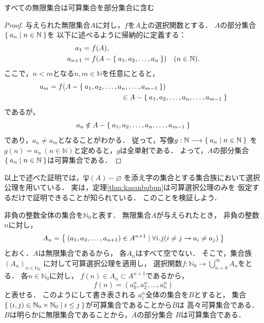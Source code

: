   \begin{thm} \label{thm:kasanbubun}
    すべての無限集合は可算集合を部分集合に含む
  \end{thm}


  \begin{proof}
    与えられた無限集合$A$に対し，$f$を$A$上の選択関数とする．
    $A$の部分集合$\Set{ a_n \mid n \in \mathbb{N}}$を
    以下に述べるように帰納的に定義する：
    \begin{align*}
      a_1 & = f(A) , \\
      a_{n+1} & = f ( A - \Set{ a_1 , a_2 , \ldots , a_n} ) \quad (n \in \mathbb{N} ).
    \end{align*}
    ここで，$n<m$となる$n ,m \in \mathbb{N}$を任意にとると，
    \begin{align*}
      & a_m = f( A - \Set{ a_1,a_2 , \ldots , a_n , \ldots , a_{m-1}}) \\
      & \hspace{4cm} \in A- \Set{ a_1,a_2, \ldots, a_n , \ldots   ,a_{m-1}}
    \end{align*}
    であるが，
    \begin{align*}
      a_n \notin A- \Set{ a_1, a_2 , \ldots ,a_n , \ldots , a_{m-1} }
    \end{align*}
    であり，$a_n \neq a_m$となることがわかる．
    従って，写像$g: \mathbb{N} \longrightarrow \Set{ a_n \mid n \in \mathbb{N} }$
    を$g(n) = a_n \ ( n \in \mathbb{N})$と定めると，$g$は全単射である．
    よって，$A$の部分集合$\Set{ a_n \mid n \in \mathbb{N}}$は可算集合である．
  \end{proof}


  以上で述べた証明では，$\mathfrak{P} (A) - \varnothing$
  を添え字の集合とする集合族において選択公理を用いている．
  実は，定理\ref{thm:kasanbubun}は可算選択公理のみを
  仮定するだけで証明できることが知られている．
  このことを検証しよう．

  非負の整数全体の集合を$\mathbb{N}_0$と表す．
  無限集合$A$が与えられたとき，
  非負の整数$n$に対し，
  \[
    A_n = \Set{ (a_1, a_2, \ldots, a_{n+1}) \in A^{n+1}
    \mid \forall i.j (i \neq j \to a_i \neq a_j)}
  \]
  とおく．$A$は無限集合であるから，
  各$A_n$はすべて空でない．
  そこで，集合族$(A_n)_{n \in \mathbb{N}_0}$
  に対して可算選択公理を適用し，
  選択関数$f: \mathbb{N}_0 \longrightarrow 
  \bigcup_{n=0}^{\infty} A_n$をとる．
  各$n \in \mathbb{N}_0$に対し，
  $f(n) \in A_n \subset A^{n+1}$であるから，
  \[
    f(n) = (a_0^n, a_2^n, \ldots , a_n^n)
  \]
  と表せる．
  このようにして書き表される
  $a^n_i$全体の集合を$B$とすると，
  集合$\Set{ (i,j) \in \mathbb{N}_0 \times \mathbb{N}_0 
  \mid i \leq j}$が可算集合であることから$B$は
  高々可算集合である．
  $B$は明らかに無限集合であることから，$A$の部分集合
  $B$は可算集合である．

